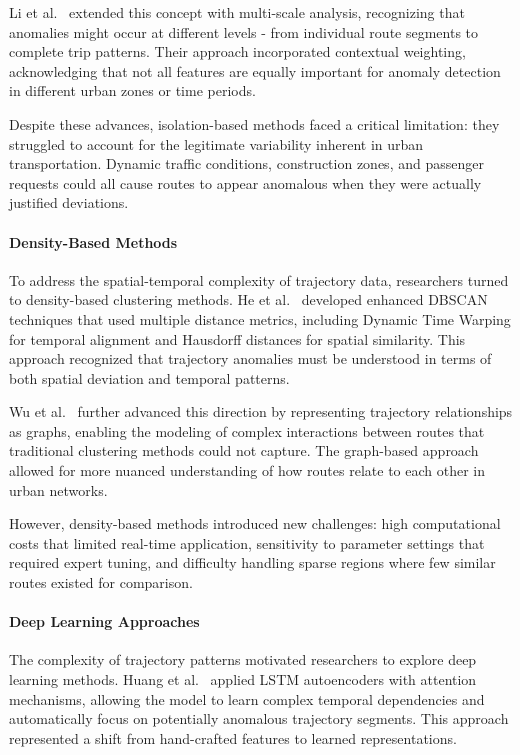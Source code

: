 \documentclass[runningheads]{llncs}
\begin{document}
Li et al.~\cite{li2022enhanced} extended this concept with multi-scale analysis, recognizing that anomalies might occur at different levels - from individual route segments to complete trip patterns. Their approach incorporated contextual weighting, acknowledging that not all features are equally important for anomaly detection in different urban zones or time periods.

Despite these advances, isolation-based methods faced a critical limitation: they struggled to account for the legitimate variability inherent in urban transportation. Dynamic traffic conditions, construction zones, and passenger requests could all cause routes to appear anomalous when they were actually justified deviations.

\paragraph{Density-Based Methods}
To address the spatial-temporal complexity of trajectory data, researchers turned to density-based clustering methods. He et al.~\cite{he2020enhanced} developed enhanced DBSCAN techniques that used multiple distance metrics, including Dynamic Time Warping for temporal alignment and Hausdorff distances for spatial similarity. This approach recognized that trajectory anomalies must be understood in terms of both spatial deviation and temporal patterns.

Wu et al.~\cite{wu2023graph} further advanced this direction by representing trajectory relationships as graphs, enabling the modeling of complex interactions between routes that traditional clustering methods could not capture. The graph-based approach allowed for more nuanced understanding of how routes relate to each other in urban networks.

However, density-based methods introduced new challenges: high computational costs that limited real-time application, sensitivity to parameter settings that required expert tuning, and difficulty handling sparse regions where few similar routes existed for comparison.

\paragraph{Deep Learning Approaches}
The complexity of trajectory patterns motivated researchers to explore deep learning methods. Huang et al.~\cite{huang2021lstm} applied LSTM autoencoders with attention mechanisms, allowing the model to learn complex temporal dependencies and automatically focus on potentially anomalous trajectory segments. This approach represented a shift from hand-crafted features to learned representations.
\end{document}
